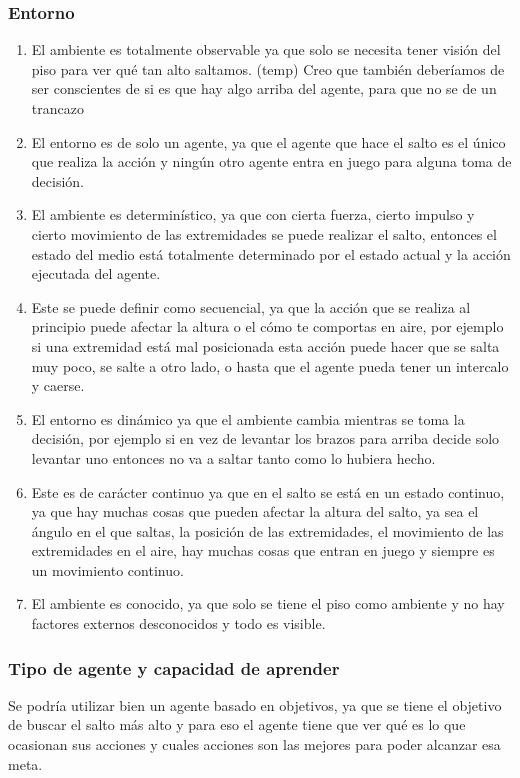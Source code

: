 \documentclass{article}
\begin{document}
            \subsubsection{Entorno}
                \begin{enumerate}
                    \item El ambiente es totalmente observable ya que solo se necesita tener visión del piso para ver qué tan alto saltamos. (temp) Creo que también deberíamos de ser conscientes de si es que hay algo arriba del agente, para que no se de un trancazo
                    \item El entorno es de solo un agente, ya que el agente que hace el salto es el único que realiza la acción y ningún otro agente entra en juego para alguna toma de decisión.
                    \item El ambiente es determinístico, ya que con cierta fuerza, cierto impulso y cierto movimiento de las extremidades se puede realizar el salto, entonces el estado del medio está totalmente determinado por el estado actual y la acción ejecutada del agente. 
                    \item Este se puede definir como secuencial, ya que la acción que se realiza al principio puede afectar la altura o el cómo te comportas en aire, por ejemplo si una extremidad está mal posicionada esta acción puede hacer que se salta muy poco, se salte a otro lado, o hasta que el agente pueda tener un intercalo y caerse.
                    \item El entorno es dinámico ya que el ambiente cambia mientras se toma la  decisión, por ejemplo si en vez de levantar los brazos para arriba decide solo levantar uno entonces no va a saltar tanto como lo hubiera hecho.
                    \item Este es de carácter continuo ya que en el salto se está en un estado continuo, ya que hay muchas cosas que pueden afectar la altura del salto, ya sea el ángulo en el que saltas, la posición de las extremidades, el movimiento de las extremidades en el aire, hay muchas cosas que entran en juego y siempre es un movimiento continuo. 
                    \item El ambiente es conocido, ya que solo se tiene el piso como ambiente y no hay factores externos desconocidos y todo es visible. 
                \end{enumerate}

            \subsubsection{Tipo de agente y capacidad de aprender}
                Se podría utilizar bien un agente basado en objetivos, ya que se tiene el objetivo de buscar el salto más alto y para eso el agente tiene que ver qué es lo que ocasionan sus acciones y cuales acciones son las mejores para poder alcanzar esa meta. 
                
\end{document}
